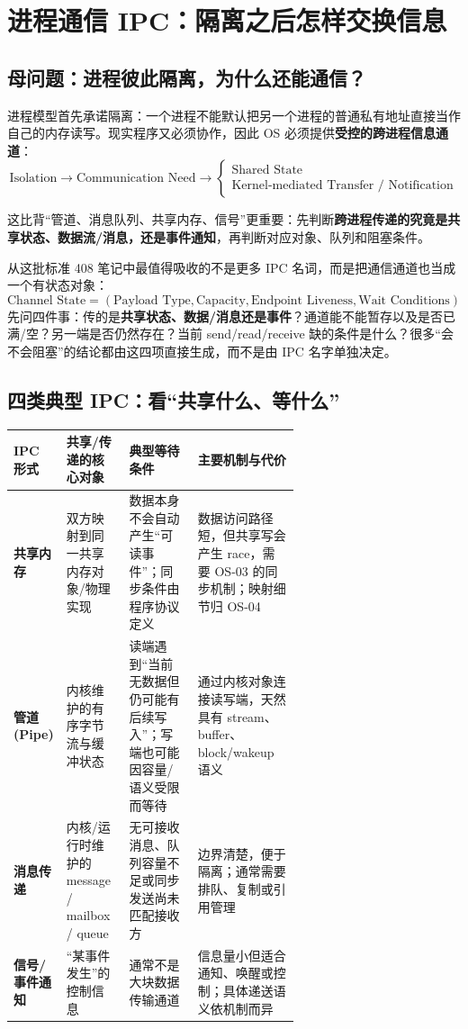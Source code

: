 \documentclass[11pt,a4paper]{ctexart}
\newcommand{\kw}[1]{\textbf{#1}}
\begin{document}
\section{进程通信 IPC：隔离之后怎样交换信息}

\subsection{母问题：进程彼此隔离，为什么还能通信？}

进程模型首先承诺隔离：一个进程不能默认把另一个进程的普通私有地址直接当作自己的内存读写。现实程序又必须协作，因此 OS 必须提供\kw{受控的跨进程信息通道}：
\[
\boxed{
\text{Isolation}
\rightarrow
\text{Communication Need}
\rightarrow
\left\{
\begin{array}{l}
\text{Shared State}\\
\text{Kernel-mediated Transfer / Notification}
\end{array}
\right.
}
\]

这比背“管道、消息队列、共享内存、信号”更重要：先判断\kw{跨进程传递的究竟是共享状态、数据流/消息，还是事件通知}，再判断对应对象、队列和阻塞条件。

\begin{corebox}
从这批标准 408 笔记中最值得吸收的不是更多 IPC 名词，而是把通信通道也当成一个有状态对象：
\[
\boxed{
\text{Channel State}
=
(\text{Payload Type},\text{Capacity},\text{Endpoint Liveness},\text{Wait Conditions})
}
\]
先问四件事：传的是\kw{共享状态、数据/消息还是事件}？通道能不能暂存以及是否已满/空？另一端是否仍然存在？当前 send/read/receive 缺的条件是什么？很多“会不会阻塞”的结论都由这四项直接生成，而不是由 IPC 名字单独决定。
\end{corebox}

\subsection{四类典型 IPC：看“共享什么、等什么”}

\begingroup
\small
\renewcommand{\arraystretch}{1.25}
\setlength{\tabcolsep}{4pt}
\begin{tabularx}{\linewidth}{>{\bfseries}p{0.17\linewidth} p{0.22\linewidth} p{0.24\linewidth} X}
\toprule
IPC 形式 & 共享/传递的核心对象 & 典型等待条件 & 主要机制与代价\\
\midrule
共享内存 & 双方映射到同一共享内存对象/物理实现 & 数据本身不会自动产生“可读事件”；同步条件由程序协议定义 & 数据访问路径短，但共享写会产生 race，需要 OS-03 的同步机制；映射细节归 OS-04\\
管道 (Pipe) & 内核维护的有序字节流与缓冲状态 & 读端遇到“当前无数据但仍可能有后续写入”；写端也可能因容量/语义受限而等待 & 通过内核对象连接读写端，天然具有 stream、buffer、block/wakeup 语义\\
消息传递 & 内核/运行时维护的 message / mailbox / queue & 无可接收消息、队列容量不足或同步发送尚未匹配接收方 & 边界清楚，便于隔离；通常需要排队、复制或引用管理\\
信号/事件通知 & “某事件发生”的控制信息 & 通常不是大块数据传输通道 & 信息量小但适合通知、唤醒或控制；具体递送语义依机制而异\\
\bottomrule
\end{tabularx}
\endgroup
\end{document}
